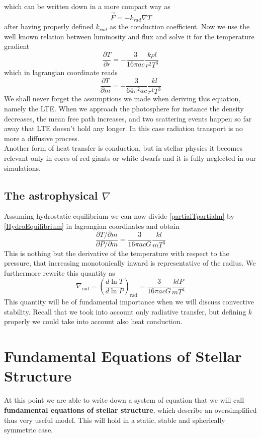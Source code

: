 which can be written down in a more compact way as 
\begin{equation}
	\vec F = - k_{rad} \nabla T
\end{equation}
after having properly defined $k_{rad}$ as the conduction coefficient. Now we use the well known relation between luminosity and flux and solve it for the temperature gradient
\begin{equation}
	\frac{\partial T}{\partial r}= - \frac{3}{16 \pi a c}\frac{k \rho l}{r^2 T^3}
\end{equation}
which in lagrangian coordinate reads
\begin{equation}\label{partialTpartialm}
	\frac{\partial T}{\partial m}= - \frac{3}{64 \pi^2 a c}\frac{k l}{r^4 T^3}
\end{equation}
We shall never forget the assumptions we made when deriving this equation, namely the LTE. When we approach the photosphere for instance the density decreases, the mean free path increases, and two scattering events happen so far away that LTE doesn't hold any longer. In this case radiation transport is no more a diffusive process. \\ 
Another form of heat transfer is conduction, but in stellar physics it becomes relevant only in cores of red giants or white dwarfs and it is fully neglected in our simulations.
\subsection{The astrophysical $\nabla$}
Assuming hydrostatic equilibrium we can now divide \ref{partialTpartialm} by \ref{HydroEquilibrium} in lagrangian coordinates and obtain
\begin{equation}
	\frac{\partial T/\partial m}{\partial P / \partial m} = \frac{3}{16 \pi a c G} \frac{k l}{m T^3}
\end{equation}
This is nothing but the derivative of the temperature with respect to the pressure, that increasing monotonically inward is representative of the radius. We furthermore rewrite this quantity as
\begin{equation}\label{nablarad}
	\nabla_{\mathrm{rad}} = \left( \frac{d \ln T}{d \ln P}  \right)_{\mathrm{rad}}= \frac{3}{16 \pi a c G} \frac{k l P}{m T^4}
\end{equation}
This quantity will be of fundamental importance when we will discuss convective stability. Recall that we took into account only radiative transfer, but defining $k$ properly we could take into account also heat conduction.
\section{Fundamental Equations of Stellar Structure}
At this point we are able to write down a system of equation that we will call \textbf{fundamental equations of stellar structure}, which describe an oversimplified thus very useful model. This will hold in a static, stable and spherically symmetric case.\\

